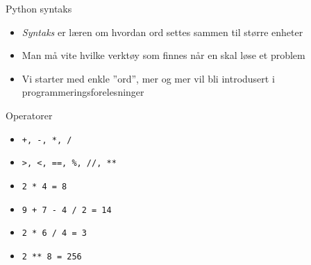 \documentclass[screen, aspectratio=169]{beamer}
\begin{document}
\begin{frame}{Python syntaks}
	\begin{itemize}
		\item \emph{Syntaks} er læren om hvordan ord settes sammen til større enheter
		\item Man må vite hvilke verktøy som finnes når en skal løse et problem
		\item Vi starter med enkle ''ord'', mer og mer vil bli introdusert i programmeringsforelesninger
	\end{itemize}
\end{frame}


\begin{frame}[fragile]{Operatorer}
	\begin{itemize}
		\item \lstinline|+, -, *, /|
		\item \lstinline|>, <, ==, %, //, **|
	\end{itemize}
	\begin{itemize}
		\item \lstinline|2 * 4 = 8|
		\item \lstinline|9 + 7 - 4 / 2 = 14|
		\item \lstinline|2 * 6 / 4 = 3|
		\item \lstinline|2 ** 8 = 256|
	\end{itemize}
\end{frame}
\end{document}
